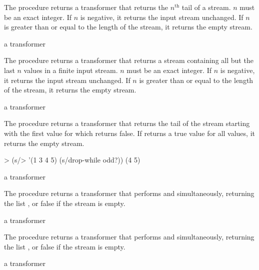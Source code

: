 The  procedure returns a transformer that returns the $n^\textrm{th}$ tail of
a stream. $n$ must be an exact integer. If $n$ is negative, it returns the input stream
unchanged. If $n$ is greater than or equal to the length of the stream, it returns the
empty stream.

\begin{procedure}
\end{procedure}
\returns{} a transformer

The  procedure returns a transformer that returns a stream containing
all but the last $n$ values in a finite input stream. $n$ must be an exact integer. If $n$
is negative, it returns the input stream unchanged. If $n$ is greater than or equal to the
length of the stream, it returns the empty stream.

\begin{procedure}
\end{procedure}
\returns{} a transformer

The  procedure returns a transformer that returns the tail of the
stream starting with the first value for which  returns false. If
 returns a true value for all values, it returns the empty stream.

\codebegin
> (s/> '(1 3 4 5) (s/drop-while odd?))
(4 5)
\codeend

\begin{procedure}
\end{procedure}
\returns{} a transformer

The  procedure returns a transformer that performs  and
 simultaneously, returning the list , or false if
the stream is empty.

\begin{procedure}
\end{procedure}
\returns{} a transformer

The  procedure returns a transformer that performs  and
 simultaneously, returning the list , or false
if the stream is empty.

\begin{procedure}
\end{procedure}
\returns{} a transformer

